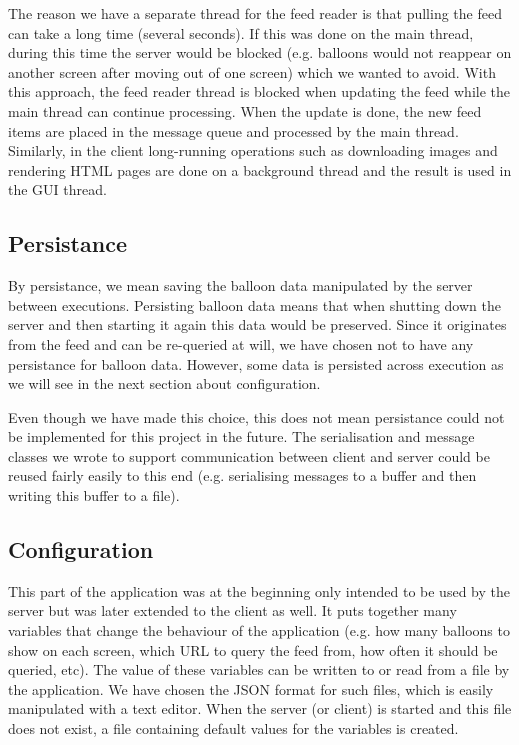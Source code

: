 The reason we have a separate thread for the feed reader is that pulling the 
feed can take a long time (several seconds). If this was done on the main 
thread, during this time the server would be blocked (e.g. balloons would not 
reappear on another screen after moving out of one screen) which we wanted to 
avoid. With this approach, the feed reader thread is blocked when updating the
feed while the main thread can continue processing. When the update is done, the
new feed items are placed in the message queue and processed by the main thread.
Similarly, in the client long-running operations such as downloading images and 
rendering HTML pages are done on a background thread and the result is used in 
the GUI thread.

\clearpage{}
\subsection{Persistance}

By persistance, we mean saving the balloon data manipulated by the server between 
executions. Persisting balloon data means that when shutting down the 
server and then starting it again this data would be preserved. Since it 
originates from the feed and can be re-queried at will, we have chosen not to
have any persistance for balloon data. However, some data is persisted across 
execution as we will see in the next section about configuration.

Even though we have made this choice, this does not mean persistance could not 
be implemented for this project in the future. The serialisation and message 
classes we wrote to support communication between client and server could be 
reused fairly easily to this end (e.g. serialising messages to a buffer and 
then writing this buffer to a file).

\subsection{Configuration}

This part of the application was at the beginning only intended to be used by 
the server but was later extended to the client as well. It puts together many 
variables that change the behaviour of the application (e.g. how many balloons 
to show on each screen, which URL to query the feed from, how often it  
should be queried, etc). The value of these variables can be written to or read 
from a file by the application. We have chosen the JSON format for such files, 
which is easily manipulated with a text editor. When the server (or client) is 
started and this file does not exist, a file containing default values for the 
variables is created.

